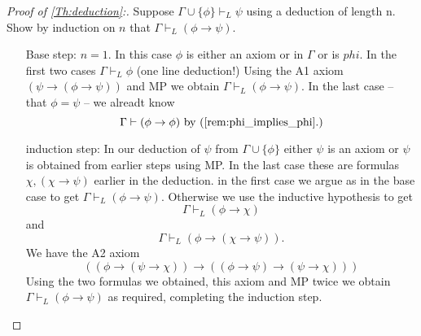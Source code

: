 \documentclass[a4paper,oneside,11pt,DIV=12,parskip=half]{scrartcl}
\theoremstyle{plain}
\theoremstyle{definition}
\newtheorem{remark, definition}[theorem]{Remark and Definition.}
\newtheorem{lemma, definition}[theorem]{Lemma and Definition.}
\newtheorem{theorem, definition}[theorem]{Theorem and Definition.}
\theoremstyle{remark}
\newtheorem*{remark, example}{\textbf{Remark and Exercise}}
\begin{document}
\begin{proof}[Proof of \ref{Th:deduction}:]
Suppose $\Gamma \cup \{\phi\} \vdash_L \psi$ using a deduction of length n. Show by induction on $n$ that $\Gamma \vdash_L (\phi \rightarrow \psi).$
\begin{itemize}
    \item[Base step:] $n = 1$. In this case $\phi$ is either an axiom or in $\Gamma$ or is $phi$. In the first two cases $\Gamma \vdash_L \phi$ (one line deduction!) Using the A1 axiom $(\psi \rightarrow (\phi \rightarrow \psi))$ and MP we obtain $\Gamma \vdash_L (\phi \rightarrow \psi)$.
    In the last case -- that $\phi = \psi$ -- we alreadt know 
     \[ \Gamma \vdash (\phi \rightarrow \phi) \text{ by (\ref{rem:phi_implies_phi}.)} \]
    
     \item[induction step:] In our deduction of $\psi$ from $\Gamma \cup \{\phi\}$ either $\psi$ is an axiom or $\psi$ is obtained from earlier steps using MP. In the last case these are formulas $\chi, (\chi \rightarrow \psi)$ earlier in the deduction.
     in the first case we argue as in the base case to get $\Gamma \vdash_L (\phi \rightarrow \psi)$.
     Otherwise we use the inductive hypothesis to get $$\Gamma \vdash_L (\phi \rightarrow \chi)$$ and 
        \[ \Gamma \vdash_L (\phi \rightarrow (\chi \rightarrow \psi)). \]
    We have the A2 axiom 
        \[ ((\phi \rightarrow (\psi \rightarrow \chi)) \rightarrow ((\phi \rightarrow \psi) \rightarrow (\psi \rightarrow \chi))) \]
    Using the two formulas we obtained, this axiom and MP twice we obtain $\Gamma \vdash_L (\phi \rightarrow \psi)$ as required, completing the induction step.
\end{itemize}
\end{proof}
\end{document}
